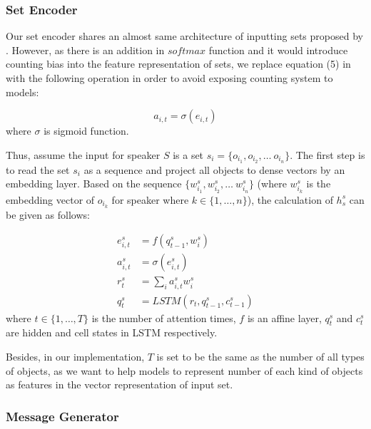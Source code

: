 \subsubsection{Set Encoder}
\label{sssec3.2.1.1:set_encoder}

Our set encoder shares an almost same architecture of inputting sets proposed by \cite{vinyals2015order}. However, as there is an addition in $softmax$ function and it would introduce counting bias into the feature representation of sets, we replace equation (5) in \cite{vinyals2015order} with the following operation in order to avoid exposing counting system to models:

\begin{equation}
  a_{i,t} = \sigma(e_{i,t})
  \label{eq3.2.1.1:sigmoid_to_replace_softmax}
\end{equation}
where $\sigma$ is sigmoid function.

Thus, assume the input for speaker $S$ is a set $s_i=\{o_{i_1}, o_{i_2}, \dots\ o_{i_n}\}$. The first step is to read the set $s_i$ as a sequence and project all objects to dense vectors by an embedding layer. Based on the sequence $\{w_{i_1}^s, w_{i_2}^s, \dots\ w_{i_n}^s\}$ (where $w_{i_k}^s$ is the embedding vector of $o_{i_k}$ for speaker where $k\in \{1, \dots, n\}$), the calculation of $h_s^s$ can be given as follows:

\begin{equation}
  \begin{split}
    e_{i, t}^s & = f(q_{t-1}^s, w_i^s) \\
    a_{i, t}^s & = \sigma(e_{i,t}^s) \\
    r_t^s & = \sum_i a_{i,t}^s w_i^s  \\
    q_t^s &= LSTM(r_t, q_{t-1}^s, c_{t-1}^s)
  \end{split}
  \label{eq3.2.1.2:speaker_hidden_calculation}  
\end{equation}
where $t\in \{1, \dots, T\}$ is the number of attention times, $f$ is an affine layer, $q^s_{t}$ and $c^s_t$ are hidden and cell states in LSTM respectively.

Besides, in our implementation, $T$ is set to be the same as the number of all types of objects, as we want to help models to represent number of each kind of objects as features in the vector representation of input set.

\subsubsection{Message Generator}
\label{sssec3.2.1.2:msg_generator}

